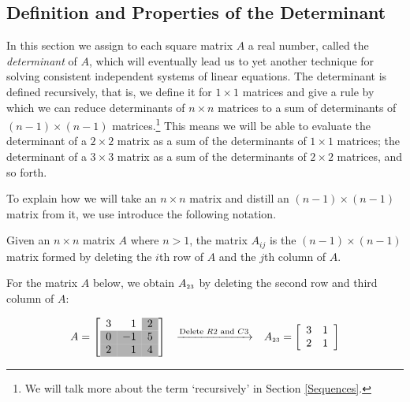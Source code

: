 \documentclass{ximera}
\begin{document}
	\author{Stitz-Zeager}




\setcounter{footnote}{0}

\label{Determinants}

\setlength{\extrarowheight}{0pt}

\subsection{Definition and Properties of the Determinant}

\label{determinantdefnandprops}

In this section we assign to each square matrix $A$ a real number, called the \textit{determinant} of $A$, which will eventually lead us to yet another technique for solving consistent independent systems of linear equations.  The determinant is defined recursively, that is, we define it for $1 \times 1$ matrices and give a rule by which we can reduce determinants of $n \times n$ matrices to a sum of determinants of $(n-1) \times (n-1)$ matrices.\footnote{We will talk more about the term `recursively' in Section \ref{Sequences}.}  This means we will be able to evaluate the determinant of a $2 \times 2$ matrix as a sum of the determinants of $1 \times 1$ matrices;  the determinant of a $3 \times 3$ matrix as a sum of the determinants of $2 \times 2$ matrices, and so forth.  

To explain how we will take an $n \times n$ matrix and distill an $(n-1) \times (n-1)$ matrix from it, we use introduce the following notation.

\smallskip

\colorbox{ResultColor}{\bbm
\begin{defn} \label{Aijdefn} Given an $n \times n$ matrix $A$ where $n>1$, the matrix $A_{ij}$ is the $(n-1) \times (n-1)$ matrix formed by deleting the $i$th row of $A$ and the $j$th column of $A$. 
\end{defn}
\ebm}

\smallskip

For the matrix $A$ below, we obtain $A_{\mbox{\tiny$23$}}$ by deleting the second row and third column of $A$:

\[ \begin{array}{ccc}

A = \left[ \begin{array}{rr>{\columncolor[gray]{0.7}}r} 3 &  1 & 2 \\ \rowcolor[gray]{0.7} 0 & -1 & 5 \\ 2 & 1 & 4 \\ \end{array} \right]
&
\xrightarrow{\text{Delete $R2$ and $C3$}}

&

A_{\mbox{\tiny$23$}} = \left[ \begin{array}{rr} 3 & 1 \\ 2 & 1 \\ \end{array} \right] \\

\end{array}\]
\end{document}
